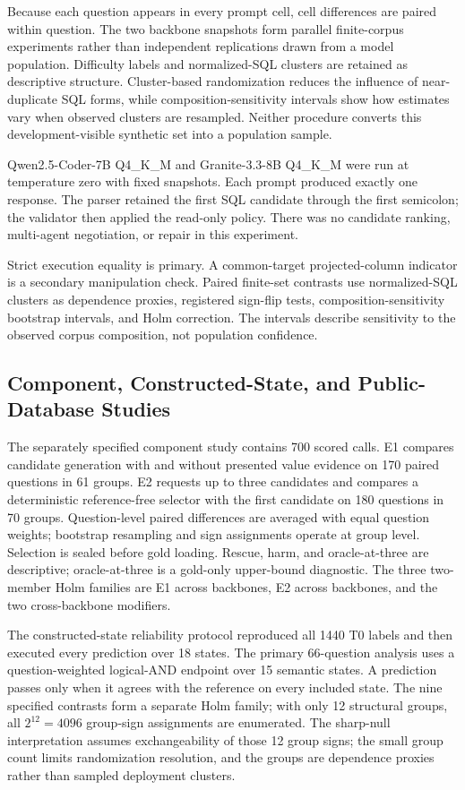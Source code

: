 \documentclass[applsci,article,submit,moreauthors]{Definitions/mdpi}
\begin{document}
Because each question appears in every prompt cell, cell differences are paired within question. The two backbone snapshots form parallel finite-corpus experiments rather than independent replications drawn from a model population. Difficulty labels and normalized-SQL clusters are retained as descriptive structure. Cluster-based randomization reduces the influence of near-duplicate SQL forms, while composition-sensitivity intervals show how estimates vary when observed clusters are resampled. Neither procedure converts this development-visible synthetic set into a population sample.

Qwen2.5-Coder-7B Q4\_K\_M and Granite-3.3-8B Q4\_K\_M were run at temperature zero with fixed snapshots. Each prompt produced exactly one response. The parser retained the first SQL candidate through the first semicolon; the validator then applied the read-only policy. There was no candidate ranking, multi-agent negotiation, or repair in this experiment.

Strict execution equality is primary. A common-target projected-column indicator is a secondary manipulation check. Paired finite-set contrasts use normalized-SQL clusters as dependence proxies, registered sign-flip tests, composition-sensitivity bootstrap intervals, and Holm correction. The intervals describe sensitivity to the observed corpus composition, not population confidence.

\subsection{Component, Constructed-State, and Public-Database Studies}

The separately specified component study contains 700 scored calls. E1 compares candidate generation with and without presented value evidence on 170 paired questions in 61 groups. E2 requests up to three candidates and compares a deterministic reference-free selector with the first candidate on 180 questions in 70 groups. Question-level paired differences are averaged with equal question weights; bootstrap resampling and sign assignments operate at group level. Selection is sealed before gold loading. Rescue, harm, and oracle-at-three are descriptive; oracle-at-three is a gold-only upper-bound diagnostic. The three two-member Holm families are E1 across backbones, E2 across backbones, and the two cross-backbone modifiers.

The constructed-state reliability protocol reproduced all 1440 T0 labels and then executed every prediction over 18 states. The primary 66-question analysis uses a question-weighted logical-AND endpoint over 15 semantic states. A prediction passes only when it agrees with the reference on every included state. The nine specified contrasts form a separate Holm family; with only 12 structural groups, all $2^{12}=4096$ group-sign assignments are enumerated. The sharp-null interpretation assumes exchangeability of those 12 group signs; the small group count limits randomization resolution, and the groups are dependence proxies rather than sampled deployment clusters.
\end{document}
